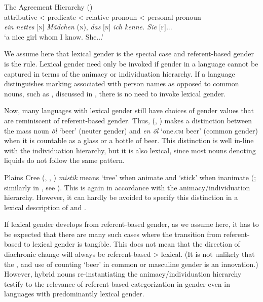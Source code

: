 \documentclass[output=collectionpaper]{langsci/langscibook}
\begin{document}
\ea\label{ex:WDG:15}
The Agreement Hierarchy (\citealt[226]{Corbett1991})\\
attributive < predicate < relative pronoun < personal pronoun\\
\textit{ein nettes} [\textsc{n}] \textit{Mädchen} (\textsc{n}), \textit{das} [\textsc{n}] \textit{ich kenne. Sie} [\textsc{f}]...\\
`a nice girl whom I know. She...'\\
\z

We assume here that lexical gender is the special case and referent-based gender is the rule. Lexical gender need only be invoked if gender in a language cannot be captured in terms of the animacy or individuation hierarchy. If a language distinguishes marking associated with person names as opposed to common nouns, such as , discussed in , there is no need to invoke lexical gender.

Now, many languages with lexical gender still have choices of gender values that are reminiscent of referent-based gender. Thus,  (, ) makes a distinction between the mass noun \textit{öl} `beer' (neuter gender) and \textit{en öl} `one.\textsc{cm} beer' (common gender) when it is countable as a glass or a bottle of beer. This distinction is well in-line with the individuation hierarchy, but it is also lexical, since most  nouns denoting liquids do not follow the same pattern.

Plains Cree (, , ) \textit{mistik} means `tree' when animate and `stick' when inanimate (\citealt[22]{Wolfart1973}; similarly in , see \citealt[128]{Straus1982}). This is again in accordance with the animacy/individuation hierarchy. However, it can hardly be avoided to specify this distinction in a lexical description of  and .

If lexical gender develops from referent-based gender, as we assume here, it has to be expected that there are many such cases where the transition from referent-based to lexical gender is tangible. This does not mean that the direction of diachronic change will always be referent-based > lexical. (It is not unlikely that the ,  and  use of counting `beer' in common \textendash{} or masculine \textendash{} gender is an innovation.) However, hybrid nouns re-instantiating the animacy/individuation hierarchy testify to the relevance of referent-based categorization in gender even in languages with predominantly lexical gender.
\end{document}
